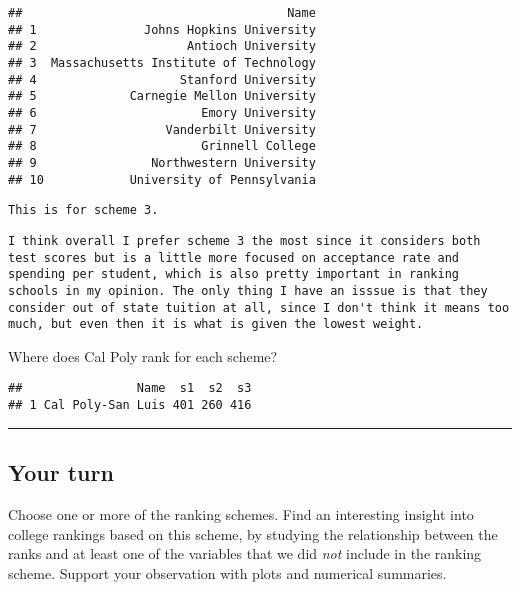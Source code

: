 \documentclass[]{article}
\newenvironment{Shaded}{\begin{snugshade}}{\end{snugshade}}
\newcommand{\KeywordTok}[1]{\textcolor[rgb]{0.13,0.29,0.53}{\textbf{#1}}}
\newcommand{\StringTok}[1]{\textcolor[rgb]{0.31,0.60,0.02}{#1}}
\newcommand{\OperatorTok}[1]{\textcolor[rgb]{0.81,0.36,0.00}{\textbf{#1}}}
\newcommand{\NormalTok}[1]{#1}
\begin{document}
\begin{verbatim}
##                                     Name
## 1               Johns Hopkins University
## 2                     Antioch University
## 3  Massachusetts Institute of Technology
## 4                    Stanford University
## 5             Carnegie Mellon University
## 6                       Emory University
## 7                  Vanderbilt University
## 8                       Grinnell College
## 9                Northwestern University
## 10            University of Pennsylvania
\end{verbatim}

\begin{verbatim}
This is for scheme 3.
\end{verbatim}

\begin{verbatim}
I think overall I prefer scheme 3 the most since it considers both test scores but is a little more focused on acceptance rate and spending per student, which is also pretty important in ranking schools in my opinion. The only thing I have an isssue is that they consider out of state tuition at all, since I don't think it means too much, but even then it is what is given the lowest weight.
\end{verbatim}

Where does Cal Poly rank for each scheme?

\begin{Shaded}
\end{Shaded}

\begin{verbatim}
##                Name  s1  s2  s3
## 1 Cal Poly-San Luis 401 260 416
\end{verbatim}

\begin{center}\rule{0.5\linewidth}{\linethickness}\end{center}

\subsection{Your turn}\label{your-turn}

Choose one or more of the ranking schemes. Find an interesting insight
into college rankings based on this scheme, by studying the relationship
between the ranks and at least one of the variables that we did
\emph{not} include in the ranking scheme. Support your observation with
plots and numerical summaries.
\end{document}
